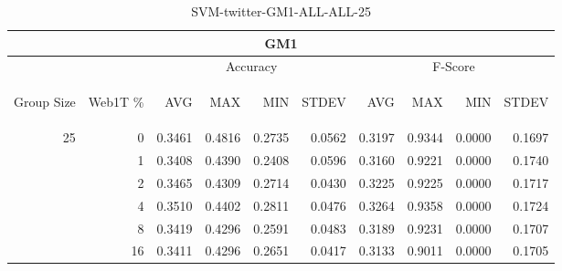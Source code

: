 \begin{center}
\begin{table}[htbp] 
 \begin{center}
\begin{tabular}{ | r | r | r | r | r | r | r | r | r | r |}
\hline
\multicolumn{10}{|c|}{GM1}\\
\hline
 & & \multicolumn{4}{|c|}{Accuracy} & \multicolumn{4}{|c|}{F-Score}\\ \cline{3-10}
\begin{sideways}Group Size\end{sideways} & \begin{sideways}Web1T \%\end{sideways} & \begin{sideways}AVG\end{sideways} & \begin{sideways}MAX\end{sideways} & \begin{sideways}MIN\end{sideways} & \begin{sideways}STDEV\end{sideways} & \begin{sideways}AVG\end{sideways} & \begin{sideways}MAX\end{sideways} & \begin{sideways}MIN\end{sideways} & \begin{sideways}STDEV\end{sideways}\\
\hline
\multirow{5}{*}{25}
 & 0 & 0.3461 & 0.4816 & 0.2735 & 0.0562 & 0.3197 & 0.9344 & 0.0000 & 0.1697\\ \cline{2-10}
 & 1 & 0.3408 & 0.4390 & 0.2408 & 0.0596 & 0.3160 & 0.9221 & 0.0000 & 0.1740\\ \cline{2-10}
 & 2 & 0.3465 & 0.4309 & 0.2714 & 0.0430 & 0.3225 & 0.9225 & 0.0000 & 0.1717\\ \cline{2-10}
 & 4 & 0.3510 & 0.4402 & 0.2811 & 0.0476 & 0.3264 & 0.9358 & 0.0000 & 0.1724\\ \cline{2-10}
 & 8 & 0.3419 & 0.4296 & 0.2591 & 0.0483 & 0.3189 & 0.9231 & 0.0000 & 0.1707\\ \cline{2-10}
 & 16 & 0.3411 & 0.4296 & 0.2651 & 0.0417 & 0.3133 & 0.9011 & 0.0000 & 0.1705\\ \cline{2-10}
\hline
\end{tabular}
\caption{SVM-twitter-GM1-ALL-ALL-25}
\label{table:SVM-twitter-GM1-ALL-ALL-25}
\end{center}
 \end{table}
\end{center}

